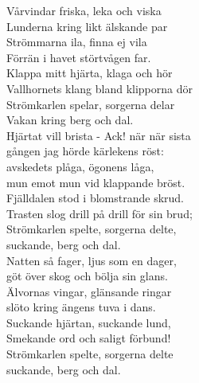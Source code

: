 \documentclass[a6paper,10pt]{article}
\begin{document}
\setlength{\oddsidemargin}{-0.37in}
\noindent
\begin{center}
\end{center}
\begin{lyrics}
Vårvindar friska, leka och viska\\
Lunderna kring likt älskande par\\
Strömmarna ila, finna ej vila\\
Förrän i havet störtvågen far.\\
Klappa mitt hjärta, klaga och hör\\
Vallhornets klang bland klipporna dör\\
Strömkarlen spelar, sorgerna delar\\
Vakan kring berg och dal.
\vspace{5pt}\\
Hjärtat vill brista - Ack! när när sista\\
gången jag hörde kärlekens röst:\\
avskedets plåga, ögonens låga,\\
mun emot mun vid klappande bröst.\\
Fjälldalen stod i blomstrande skrud.\\
Trasten slog drill på drill för sin brud;\\
Strömkarlen spelte, sorgerna delte,\\
suckande, berg och dal.
\vspace{5pt}\\
Natten så fager, ljus som en dager,\\
göt över skog och bölja sin glans.\\
Älvornas vingar, glänsande ringar\\
slöto kring ängens tuva i dans.\\
Suckande hjärtan, suckande lund,\\
Smekande ord och saligt förbund!\\
Strömkarlen spelte, sorgerna delte\\
suckande, berg och dal.


\end{lyrics}
\end{document}
